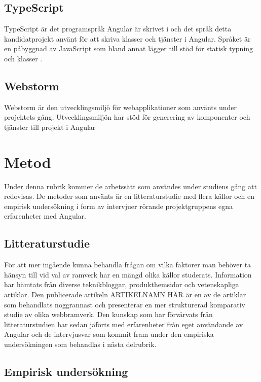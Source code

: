 \subsection{TypeScript}

TypeScript är det programspråk Angular är skrivet i och det språk detta kandidatprojekt använt för att skriva klasser och tjänster i Angular. Språket är en påbyggnad av JavaScript som bland annat lägger till stöd för statisk typning och klasser \cite{typescript}.

\subsection{Webstorm}

Webstorm är den utvecklingsmiljö för webapplikationer som använts under projektets gång. Utvecklingsmiljön har stöd för generering av komponenter och tjänster till projekt i Angular 



\section{Metod}

Under denna rubrik kommer de arbetssätt som användes under studiens gång att redovisas. De metoder som använts är en litteraturstudie med flera källor och en empirisk undersökning i form av intervjuer rörande projektgruppens egna erfarenheter med Angular.

\subsection{Litteraturstudie}

För att mer ingående kunna behandla frågan om vilka faktorer man behöver ta hänsyn till vid val av ramverk har en mängd olika källor studerats. Information har hämtats från diverse teknikbloggar, produkthemsidor och vetenskapliga artiklar. Den publicerade artikeln ARTIKELNAMN HÄR är en av de artiklar som behandlats noggrannast och presenterar en mer strukturerad komparativ studie av olika webbramverk. Den kunskap som har förvärvats från litteraturstudien har sedan jäförts med erfarenheter från eget användande av Angular och de intervjusvar som kommit fram under den empiriska undersökningen som behandlas i nästa delrubrik.

\subsection{Empirisk undersökning} 

